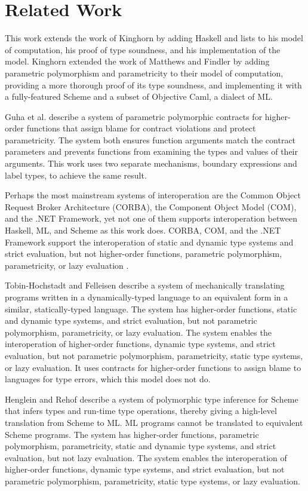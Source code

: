 \chapter{Related Work}

This work extends the work of Kinghorn \cite{kinghorn07} by adding Haskell and lists to his model of computation, his proof of type soundness, and his implementation of the model.  Kinghorn extended the work of Matthews and Findler \cite{matthews07} by adding parametric polymorphism and parametricity to their model of computation, providing a more thorough proof of its type soundness, and implementing it with a fully-featured Scheme and a subset of Objective Caml, a dialect of ML.

Guha et al. \cite{guha07} describe a system of parametric polymorphic contracts for higher-order functions that assign blame for contract violations and protect parametricity.  The system both ensures function arguments match the contract parameters and prevents functions from examining the types and values of their arguments. This work uses two separate mechanisms, boundary expressions and label types, to achieve the same result.

Perhaps the most mainstream systems of interoperation are the Common Object Request Broker Architecture (CORBA), the Component Object Model (COM), and the .NET Framework, yet not one of them supports interoperation between Haskell, ML, and Scheme as this work does.  CORBA, COM, and the .NET Framework support the interoperation of static and dynamic type systems and strict evaluation, but not higher-order functions, parametric polymorphism, parametricity, or lazy evaluation \cite{omg04} \cite{microsoft07} \cite{ecma06}.

Tobin-Hochstadt and Felleisen \cite{tobin-hochstadt06} describe a system of mechanically translating programs written in a dynamically-typed language to an equivalent form in a similar, statically-typed language.  The system has higher-order functions, static and dynamic type systems, and strict evaluation, but not parametric polymorphism, parametricity, or lazy evaluation.  The system enables the interoperation of higher-order functions, dynamic type systems, and strict evaluation, but not parametric polymorphism, parametricity, static type systems, or lazy evaluation.  It uses contracts for higher-order functions to assign blame to languages for type errors, which this model does not do.

Henglein and Rehof \cite{henglein95} describe a system of polymorphic type inference for Scheme that infers types and run-time type operations, thereby giving a high-level translation from Scheme to ML.  ML programs cannot be translated to equivalent Scheme programs.  The system has higher-order functions, parametric polymorphism, parametricity, static and dynamic type systems, and strict evaluation, but not lazy evaluation.  The system enables the interoperation of higher-order functions, dynamic type systems, and strict evaluation, but not parametric polymorphism, parametricity, static type systems, or lazy evaluation.

